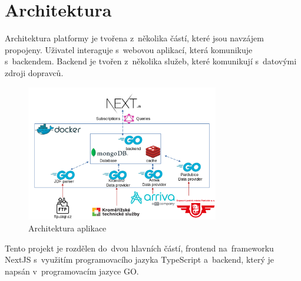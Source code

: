 \section{Architektura}
Architektura platformy je tvořena z~několika částí, které jsou navzájem propojeny. Uživatel interaguje s~webovou aplikací, která komunikuje s~backendem. Backend je tvořen z~několika služeb, které komunikují s~datovými zdroji dopravců.
\begin{figure}[H]
    \centering
    \includegraphics[width=0.75\textwidth]{images/architekturaV5.png}
    \caption{Architektura aplikace}
    \label{architektura}
\end{figure}
\newpage
Tento projekt je rozdělen do~dvou hlavních částí, frontend na~frameworku NextJS s~využitím programovacího jazyka TypeScript a~backend, který je napsán v~programovacím jazyce GO.